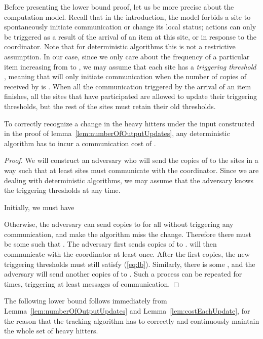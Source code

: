 \documentclass[10pt]{article}
\begin{document}
Before presenting the lower bound proof, let us be more precise about
the computation model.  Recall that in the introduction, the model
forbids a site to spontaneously initiate communication or change its
local status; actions can only be triggered as a result of the
arrival of an item at this site, or in response to the coordinator.  Note
that for deterministic algorithms this is not a restrictive
assumption. 
In our case, since we only care about the frequency of a particular
item  increasing from  to , we may assume that
each site  has a {\em triggering threshold} , meaning that
 will only initiate communication when the number of copies of
 received by  is .  When all the communication triggered
by the arrival of an item finishes, all the sites that have
participated are allowed to update their triggering thresholds, but
the rest of the sites must retain their old thresholds.  

\begin{lemma}
\label{lem:costEachUpdate} To correctly recognize a change in
the heavy hitters under the input constructed in the proof of
lemma~\ref{lem:numberOfOutputUpdates}, any deterministic algorithm has to
incur a communication cost of .
\end{lemma}

\begin{proof}
  We will construct an adversary who will send the  copies of
   to the sites in a way such that at least  sites must
  communicate with the coordinator.  Since we are dealing with
  deterministic algorithms, we may assume that the adversary knows the
  triggering thresholds  at any time.

Initially, we must have

Otherwise, the adversary can send  copies to  for all 
without triggering any communication, and make the algorithm miss the
change.  Therefore there must be some  such that .  The adversary first sends  copies of
 to .   will then communicate with the coordinator at least
once.  After the first  copies, the new triggering thresholds
must still satisfy (\ref{eq:lb}).  Similarly, there is some , and the adversary will send another  copies
of  to .  Such a process can be repeated for  times, triggering at least 
messages of communication.
\end{proof}

The following lower bound follows immediately from
Lemma~\ref{lem:numberOfOutputUpdates} and
Lemma~\ref{lem:costEachUpdate}, for the reason that the tracking
algorithm has to correctly and continuously maintain the whole set
of heavy hitters.
\end{document}
